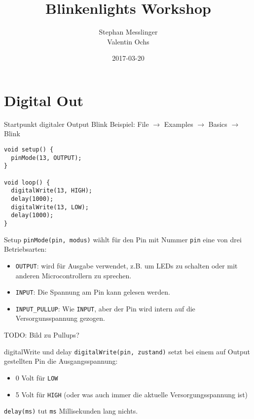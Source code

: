 \documentclass[bigger]{beamer}
\author{Stephan Messlinger \\ Valentin Ochs}
\date{2017-03-20}
\title{Blinkenlights Workshop}
\begin{document}
\maketitle

\section{Digital Out}
\label{sec-1}
\begin{frame}[fragile,label=sec-1-1]{Startpunkt digitaler Output}
 Blink Beispiel: File $\rightarrow$ Examples $\rightarrow$ Basics $\rightarrow$ Blink

\begin{verbatim}
void setup() {
  pinMode(13, OUTPUT);
}

void loop() {
  digitalWrite(13, HIGH);
  delay(1000);
  digitalWrite(13, LOW);
  delay(1000);
}
\end{verbatim}
\end{frame}

\begin{frame}[fragile,label=sec-1-2]{Setup}
 \verb~pinMode(pin, modus)~ wählt für den Pin mit Nummer \verb~pin~ eine von drei
Betriebsarten:

\begin{itemize}
\item \verb~OUTPUT~: wird für Ausgabe verwendet, z.B. um LEDs zu schalten oder
mit anderen Microcontrollern zu sprechen.
\item \verb~INPUT~: Die Spannung am Pin kann gelesen werden.
\item \verb~INPUT_PULLUP~: Wie \verb~INPUT~, aber der Pin wird intern auf die
Versorgunsspannung gezogen.
\end{itemize}

TODO: Bild zu Pullups?
\end{frame}

\begin{frame}[fragile,label=sec-1-3]{digitalWrite und delay}
 \verb~digitalWrite(pin, zustand)~ setzt bei einem auf Output gestellten Pin
die Ausgangsspannung:

\begin{itemize}
\item 0 Volt für \verb~LOW~
\item 5 Volt für \verb~HIGH~ (oder was auch immer die aktuelle
Versorgungsspannung ist)
\end{itemize}

\verb~delay(ms)~ tut \verb~ms~ Millisekunden lang nichts.
\end{frame}
\end{document}
